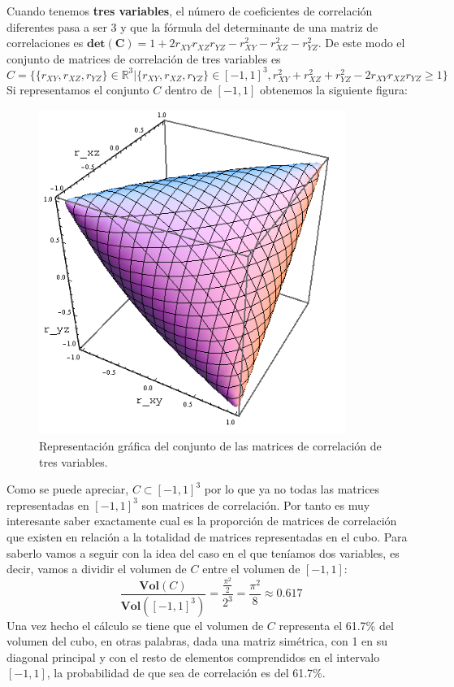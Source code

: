 \documentclass[a4paper,openright,12pt]{report}
\begin{document}
{\normalsize Cuando tenemos \textbf{tres variables}, el número de coeficientes de correlación diferentes pasa a ser 3 y que la fórmula del determinante de una matriz de correlaciones es 
$\mathbf{det(C)}=1+2r_{XY}r_{XZ}r_{YZ}-r_{XY}^{2}-r_{XZ}^{2}-r_{YZ}^{2}$. De este modo el conjunto de matrices de correlación de tres variables es} {\tiny $$C=\lbrace\lbrace r_{XY},r_{XZ},r_{YZ}\rbrace \in \mathbb{R}^{3} \vert \lbrace r_{XY},r_{XZ},r_{YZ} \rbrace \in [-1,1]^{3}, r_{XY}^{2}+r_{XZ}^{2}+r_{YZ}^{2}-2r_{XY}r_{XZ}r_{YZ} \geq 1 \rbrace$$}
Si representamos el conjunto $C$ dentro de $[-1,1]$ obtenemos la siguiente figura:
\newpage
\medskip 
\begin{figure}[htb]
\begin{center}
\includegraphics[width=10cm]{matriz_correlacion_3vars}
\caption{Representación gráfica del conjunto de las matrices de correlación de tres variables.}
\label{Fig_matriz_correlacion_2vars}
\end{center}
\end{figure}

Como se puede apreciar, $C\subset [-1,1]^{3}$ por lo que ya no todas las matrices representadas en $[-1,1]^{3}$ son matrices de correlación. Por tanto es muy interesante saber exactamente cual es la proporción de matrices de correlación que existen en relación a la totalidad de matrices representadas en el cubo. Para saberlo vamos a seguir con la idea del caso en el que teníamos dos variables, es decir, vamos a dividir el volumen de $C$ entre el volumen de $[-1,1]$: $$\dfrac{\mathbf{Vol}(C)}{\mathbf{Vol}([-1,1]^{3})}=\dfrac{\frac{\pi^{2}}{2}}{2^{3}}=\dfrac{\pi^{2}}{8}\approx 0.617$$
Una vez hecho el cálculo se tiene que el volumen de $C$ representa el 61.7\% del volumen del cubo, en otras palabras, dada una matriz simétrica, con 1 en su diagonal principal y con el resto de elementos comprendidos en el intervalo $[-1,1]$, la probabilidad de que sea de correlación es del 61.7\%. 
\end{document}
